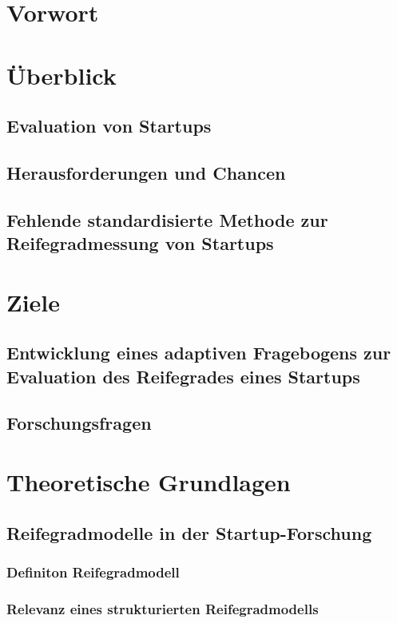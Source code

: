 \thispagestyle{fancy}
\chapter{Vorwort}
\chapter{Überblick}

\section{Evaluation von Startups}
\section{Herausforderungen und Chancen}
\section{Fehlende standardisierte Methode zur Reifegradmessung von Startups}

\chapter{Ziele}
\section{Entwicklung eines adaptiven Fragebogens zur Evaluation des Reifegrades eines Startups}
\section{Forschungsfragen}


\chapter{Theoretische Grundlagen}

\section{Reifegradmodelle in der Startup-Forschung}
\subsection{Definiton Reifegradmodell}
\subsection{Relevanz eines strukturierten Reifegradmodells}
